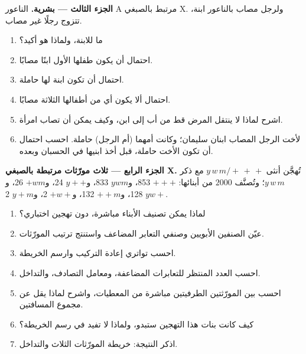 \begin{problem}
\medskip
\noindent\textbf{الجزء الثالث ---  بشرية.}
الناعور A  مرتبط بالصبغي X. ولرجل مصاب بالناعور
ابنة، تتزوج رجلًا غير مصاب.
\begin{enumerate}[resume]
  \item ما  للابنة، ولماذا هو أكيد؟
  \item احتمال أن يكون طفلها الأول ابنًا مصابًا.
  \item احتمال أن تكون ابنة لها حاملة.
  \item احتمال ألا يكون أي من أطفالها الثلاثة مصابًا.
  \item اشرح لماذا لا ينتقل المرض قط من أب إلى ابن، وكيف يمكن أن
        تصاب امرأة.
  \item لأخت الرجل المصاب ابنان سليمان؛ وكانت أمهما (أم الرجل)
        حاملة. احسب احتمال أن تكون الأخت حاملة، قبل أخذ ابنيها
        في الحسبان وبعده.
\end{enumerate}

\medskip
\noindent\textbf{الجزء الرابع --- ثلاث مورّثات مرتبطة بالصبغي X.}
تُهجَّن أنثى $y\,w\,m/+\,+\,+$ مع ذكر $y\,w\,m$؛ وتُصنَّف $2000$
من أبنائها: $+++$ 853، و$ywm$ 833، و$y++$ 24، و$+wm$ 26، و$yw+$ 128،
و$++m$ 132، و$+w+$ 2، و$y+m$ 2.
\begin{enumerate}[resume]
  \item لماذا يمكن تصنيف الأبناء مباشرة، دون تهجين اختباري؟
  \item عيّن الصنفين الأبويين وصنفي التعابر المضاعف واستنتج ترتيب
        المورّثات.
  \item احسب تواتري إعادة التركيب وارسم الخريطة.
  \item احسب العدد المنتظر للتعابرات المضاعفة، ومعامل التصادف،
        والتداخل.
  \item احسب  بين المورّثتين الطرفيتين مباشرة من
        المعطيات، واشرح لماذا يقل عن مجموع المسافتين.
  \item كيف كانت بنات هذا التهجين ستبدو، ولماذا لا تفيد في رسم
        الخريطة؟
  \item اذكر النتيجة: خريطة المورّثات الثلاث والتداخل.
\end{enumerate}
\end{problem}
